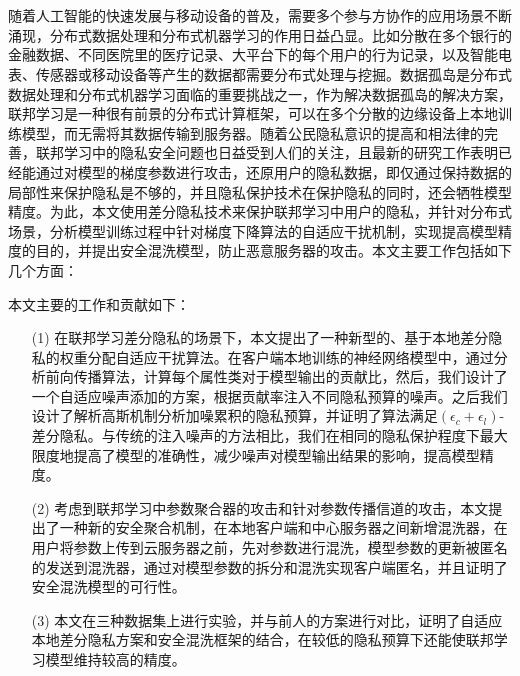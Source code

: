 \vspace{-2.5cm}
\chapter*{}

随着人工智能的快速发展与移动设备的普及，需要多个参与方协作的应用场景不断涌现，分布式数据处理和分布式机器学习的作用日益凸显。比如分散在多个银行的金融数据、不同医院里的医疗记录、大平台下的每个用户的行为记录，以及智能电表、传感器或移动设备等产生的数据都需要分布式处理与挖掘。数据孤岛是分布式数据处理和分布式机器学习面临的重要挑战之一，作为解决数据孤岛的解决方案，联邦学习是一种很有前景的分布式计算框架，可以在多个分散的边缘设备上本地训练模型，而无需将其数据传输到服务器。随着公民隐私意识的提高和相法律的完善，联邦学习中的隐私安全问题也日益受到人们的关注，且最新的研究工作表明已经能通过对模型的梯度参数进行攻击，还原用户的隐私数据，即仅通过保持数据的局部性来保护隐私是不够的，并且隐私保护技术在保护隐私的同时，还会牺牲模型精度。为此，本文使用差分隐私技术来保护联邦学习中用户的隐私，并针对分布式场景，分析模型训练过程中针对梯度下降算法的自适应干扰机制，实现提高模型精度的目的，并提出安全混洗模型，防止恶意服务器的攻击。本文主要工作包括如下几个方面：

本文主要的工作和贡献如下：
\begin{enumerate}
\item [(1)] 在联邦学习差分隐私的场景下，本文提出了一种新型的、基于本地差分隐私的权重分配自适应干扰算法。在客户端本地训练的神经网络模型中，通过分析前向传播算法，计算每个属性类对于模型输出的贡献比，然后，我们设计了一个自适应噪声添加的方案，根据贡献率注入不同隐私预算的噪声。之后我们设计了解析高斯机制分析加噪累积的隐私预算，并证明了算法满足$\left(\epsilon_{c}+\epsilon_{l}\right)$-差分隐私。与传统的注入噪声的方法相比，我们在相同的隐私保护程度下最大限度地提高了模型的准确性，减少噪声对模型输出结果的影响，提高模型精度。
\item [(2)] 考虑到联邦学习中参数聚合器的攻击和针对参数传播信道的攻击，本文提出了一种新的安全聚合机制，在本地客户端和中心服务器之间新增混洗器，在用户将参数上传到云服务器之前，先对参数进行混洗，模型参数的更新被匿名的发送到混洗器，通过对模型参数的拆分和混洗实现客户端匿名，并且证明了安全混洗模型的可行性。
\item [(3)] 本文在三种数据集上进行实验，并与前人的方案进行对比，证明了自适应本地差分隐私方案和安全混洗框架的结合，在较低的隐私预算下还能使联邦学习模型维持较高的精度。
\end{enumerate}
\hspace{-0.5cm}
 
